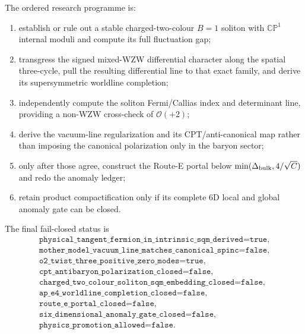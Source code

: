\documentclass[11pt]{article}
\theoremstyle{definition}
\theoremstyle{remark}
\newcommand{\CP}{\mathbb {CP}}
\newcommand{\cO}{\mathcal O}
\begin{document}
The ordered research programme is:
\begin{enumerate}
\item establish or rule out a stable charged-two-colour \(B=1\) soliton with
  \(\CP^1\) internal moduli and compute its full fluctuation gap;
\item transgress the signed mixed-WZW differential character along the
  spatial three-cycle, pull the resulting differential line to that exact
  family, and derive its supersymmetric worldline completion;
\item independently compute the soliton Fermi/Callias index and determinant
  line, providing a non-WZW cross-check of \(\cO(+2)\);
\item derive the vacuum-line regularization and its CPT/anti-canonical map
  rather than imposing the canonical polarization only in the baryon sector;
\item only after those agree, construct the Route-E portal below
  \(\min(\Delta_{\rm bulk},4/\sqrt C)\) and redo the anomaly ledger;
\item retain product compactification only if its complete 6D local and
  global anomaly gate can be closed.
\end{enumerate}

The final fail-closed status is
\begin{equation}
 \boxed{\begin{gathered}
 \texttt{physical\_tangent\_fermion\_in\_intrinsic\_sqm\_derived=true},\\
 \texttt{mother\_model\_vacuum\_line\_matches\_canonical\_spinc=false},\\
 \texttt{o2\_twist\_three\_positive\_zero\_modes=true},\\
 \texttt{cpt\_antibaryon\_polarization\_closed=false},\\
 \texttt{charged\_two\_colour\_soliton\_sqm\_embedding\_closed=false},\\
 \texttt{ap\_e4\_worldline\_completion\_closed=false},\\
 \texttt{route\_e\_portal\_closed=false},\\
 \texttt{six\_dimensional\_anomaly\_gate\_closed=false},\\
 \texttt{physics\_promotion\_allowed=false}.
 \end{gathered}}
 \label{eq:final-status}
\end{equation}



\end{document}

